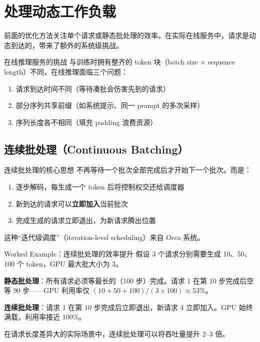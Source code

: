 \section{处理动态工作负载}

前面的优化方法关注单个请求或静态批处理的效率。在实际在线服务中，请求是动态到达的，带来了额外的系统级挑战。

\begin{knowledgebox}{在线推理服务的挑战}
与训练时拥有整齐的 token 块（batch size $\times$ sequence length）不同，在线推理面临三个问题：
\begin{enumerate}
    \item 请求到达时间不同（等待凑批会伤害先到的请求）
    \item 部分序列共享前缀（如系统提示、同一 prompt 的多次采样）
    \item 序列长度各不相同（填充 padding 浪费资源）
\end{enumerate}
\end{knowledgebox}

\subsection{连续批处理（Continuous Batching）}

\begin{importantbox}{连续批处理的核心思想}
不再等待一个批次全部完成后才开始下一个批次。而是：
\begin{enumerate}
    \item 逐步解码，每生成一个 token 后将控制权交还给调度器
    \item 新到达的请求可以\textbf{立即加入}当前批次
    \item 完成生成的请求立即退出，为新请求腾出位置
\end{enumerate}
这种``迭代级调度''（iteration-level scheduling）来自 Orca 系统。
\end{importantbox}

\begin{knowledgebox}{Worked Example：连续批处理的效率提升}
假设 3 个请求分别需要生成 10、50、100 个 token，GPU 最大批大小为 3。

\textbf{静态批处理}：所有请求必须等最长的（100 步）完成。请求 1 在第 10 步完成后空等 90 步——GPU 利用率仅 $(10+50+100)/(3 \times 100) \approx 53\%$。

\textbf{连续批处理}：请求 1 在第 10 步完成后立即退出，新请求 4 立即加入。GPU 始终满载，利用率接近 100\%。

在请求长度差异大的实际场景中，连续批处理可以将吞吐量提升 2--3 倍。
\end{knowledgebox}

